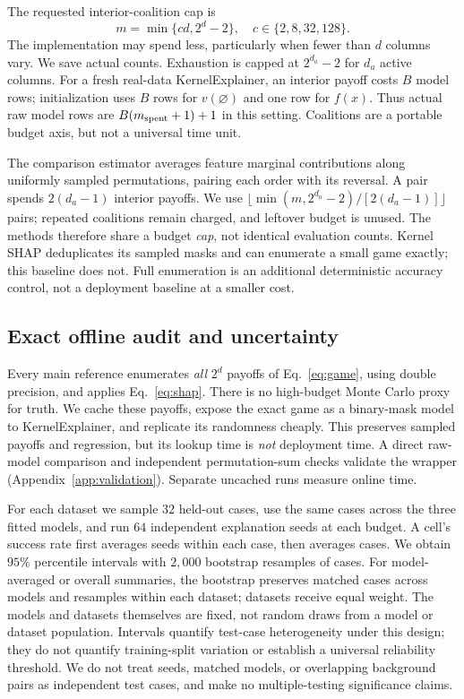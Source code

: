 The requested interior-coalition cap is
\begin{equation}
 m=\min\{c d,2^d-2\},\quad c\in\{2,8,32,128\}.
\end{equation}
The implementation may spend less, particularly when fewer than $d$ columns vary. We save actual counts. Exhaustion is capped at $2^{d_a}-2$ for $d_a$ active columns. For a fresh real-data KernelExplainer, an interior payoff costs $B$ model rows; initialization uses $B$ rows for $v(\varnothing)$ and one row for $f(x)$. Thus actual raw model rows are $B(m_{\rm spent}+1)+1$ in this setting. Coalitions are a portable budget axis, but not a universal time unit.

The comparison estimator averages feature marginal contributions along uniformly sampled permutations, pairing each order with its reversal. A pair spends $2(d_a-1)$ interior payoffs. We use $\lfloor\min(m,2^{d_a}-2)/[2(d_a-1)]\rfloor$ pairs; repeated coalitions remain charged, and leftover budget is unused. The methods therefore share a budget \emph{cap}, not identical evaluation counts. Kernel SHAP deduplicates its sampled masks and can enumerate a small game exactly; this baseline does not. Full enumeration is an additional deterministic accuracy control, not a deployment baseline at a smaller cost.

\subsection{Exact offline audit and uncertainty}
Every main reference enumerates \emph{all} $2^d$ payoffs of Eq.~\eqref{eq:game}, using double precision, and applies Eq.~\eqref{eq:shap}. There is no high-budget Monte Carlo proxy for truth. We cache these payoffs, expose the exact game as a binary-mask model to KernelExplainer, and replicate its randomness cheaply. This preserves sampled payoffs and regression, but its lookup time is \emph{not} deployment time. A direct raw-model comparison and independent permutation-sum checks validate the wrapper (Appendix~\ref{app:validation}). Separate uncached runs measure online time.

For each dataset we sample $32$ held-out cases, use the same cases across the three fitted models, and run $64$ independent explanation seeds at each budget. A cell's success rate first averages seeds within each case, then averages cases. We obtain $95\%$ percentile intervals with $2{,}000$ bootstrap resamples of cases. For model-averaged or overall summaries, the bootstrap preserves matched cases across models and resamples within each dataset; datasets receive equal weight. The models and datasets themselves are fixed, not random draws from a model or dataset population. Intervals quantify test-case heterogeneity under this design; they do not quantify training-split variation or establish a universal reliability threshold. We do not treat seeds, matched models, or overlapping background pairs as independent test cases, and make no multiple-testing significance claims.
